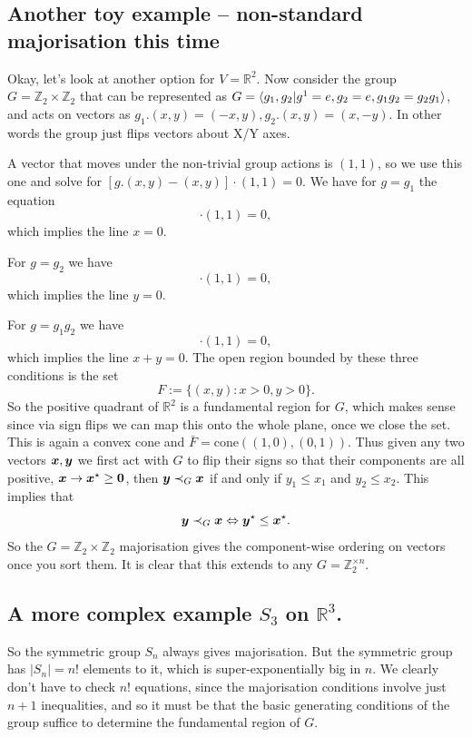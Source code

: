 \documentclass[pra,
aps,
twocolumn,
superscriptaddress,
groupedaddress,
nofootinbib,
reprint
]{revtex4-1}
\begin{document}
\subsection{Another toy example -- non-standard majorisation this time}
Okay, let's look at another option for $V=\mathbb{R}^2$. Now consider the group $G=\mathbb{Z}_2 \times \mathbb{Z}_2$ that can be represented as $G=\langle g_1,g_2 | g^1=e, g_2 = e, g_1g_2 = g_2g_1\rangle$, and acts on vectors as $g_1.(x,y) = (-x,y), g_2.(x,y)=(x,-y)$. In other words the group just flips vectors about X/Y axes.

A vector that moves under the non-trivial group actions is $(1,1)$, so we use this one and solve for $[g.(x,y) - (x,y)] \cdot (1,1) = 0$. We have for $g = g_1$ the equation
\begin{equation}
[(-x,y) - (x,y)]\cdot (1,1) = 0,
\end{equation}
which implies the line $x=0$.

For $g=g_2$ we have
\begin{equation}
[(x,-y) - (x,y)]\cdot (1,1) = 0,
\end{equation}
which implies the line $y=0$.

For $g=g_1g_2$ we have
\begin{equation}
[(-x,-y) - (x,y)]\cdot (1,1) = 0,
\end{equation}
which implies the line $x+y=0$. The open region bounded by these three conditions is the set
\begin{equation}
F := \{ (x,y) : x>0, y>0\}.
\end{equation}
So the positive quadrant of $\mathbb{R}^2$ is a fundamental region for $G$, which makes sense since via sign flips we can map this onto the whole plane, once we close the set. This is again a convex cone and $\bar{F} = \mbox{cone}((1,0), (0,1))$. Thus given any two vectors $\boldsymbol{x},\boldsymbol{y}$ we first act with $G$ to flip their signs so that their components are all positive, $\boldsymbol{x} \rightarrow \boldsymbol{x}^\star\ge \mathbf{0}$, then $\boldsymbol{y} \prec_G \boldsymbol{x}$ if and only if $y_1 \le x_1$ and $y_2 \le x_2$. This implies that 
\begin{equation}
\boldsymbol{y} \prec_G \boldsymbol{x} \Leftrightarrow \boldsymbol{y}^\star \le \boldsymbol{x}^\star. 
\end{equation}
So the $G=\mathbb{Z}_2 \times \mathbb{Z}_2$ majorisation gives the component-wise ordering on vectors once you sort them. It is clear that this extends to any $G=\mathbb{Z}_2^{\times n}$.
\subsection{A more complex example $S_3$ on $\mathbb{R}^3$.}
So the symmetric group $S_n$ always gives majorisation. But the symmetric group has $|S_n| = n!$ elements to it, which is super-exponentially big in $n$. We clearly don't have to check $n!$ equations, since the majorisation conditions involve just $n+1$ inequalities, and so it must be that the basic generating conditions of the group suffice to determine the fundamental region of $G$.
\end{document}
